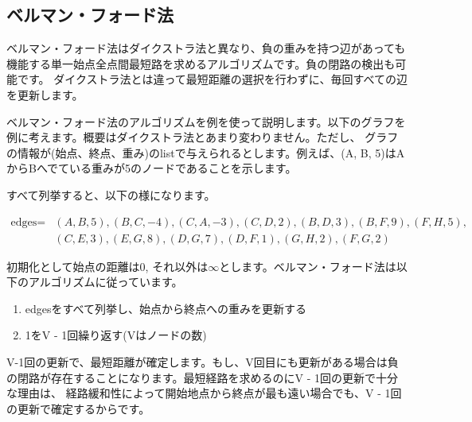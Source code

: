 \documentclass{jlreq}
\begin{document}
\newpage

\subsection{ベルマン・フォード法}
ベルマン・フォード法はダイクストラ法と異なり、負の重みを持つ辺があっても機能する単一始点全点間最短路を求めるアルゴリズムです。負の閉路の検出も可能です。
ダイクストラ法とは違って最短距離の選択を行わずに、毎回すべての辺を更新します。

ベルマン・フォード法のアルゴリズムを例を使って説明します。以下のグラフを例に考えます。概要はダイクストラ法とあまり変わりません。ただし、
グラフの情報が(始点、終点、重み)のlistで与えられるとします。例えば、(A, B, 5)はAからBへでている重みが5のノードであることを示します。

すべて列挙すると、以下の様になります。

\begin{equation*}
  \begin{aligned}
    \text{edges} =
    &(A, B, 5), (B, C, -4), (C, A, -3), (C, D, 2), (B, D, 3), (B, F, 9), (F, H, 5), \\
    &(C, E, 3), (E, G, 8), (D, G, 7), (D, F, 1), (G, H, 2), (F, G, 2)
  \end{aligned}
\end{equation*}

初期化として始点の距離は0, それ以外は$\infty$とします。ベルマン・フォード法は以下のアルゴリズムに従っています。

\begin{enumerate}
  \item edgesをすべて列挙し、始点から終点への重みを更新する
  \item 1をV - 1回繰り返す(Vはノードの数)
\end{enumerate}

V-1回の更新で、最短距離が確定します。もし、V回目にも更新がある場合は負の閉路が存在することになります。最短経路を求めるのにV - 1回の更新で十分な理由は、
経路緩和性によって開始地点から終点が最も遠い場合でも、V - 1回の更新で確定するからです。
\end{document}
